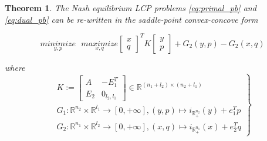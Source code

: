 \documentclass{article} %
\newtheorem{theorem}{Theorem} \newtheorem{lemma}[theorem]{Lemma}
\begin{document}
\begin{theorem}
  The Nash equilibrium LCP problems \eqref{eq:primal_pb} and \eqref{eq:dual_pb} can be re-written in the saddle-point convex-concove form
  
  \begin{equation}
    \underset{y, p}{minimize}\text{ }\underset{x, q}{maximize}
           {\begin{bmatrix}x\\q\end{bmatrix}^TK\begin{bmatrix}y\\p\end{bmatrix} + G_2(y, p) - G_2(x, q)}
           \label{eq:unconstrained_pb}
  \end{equation}

  where
  \begin{equation}
    \left .
    \begin{split}
      K :=
      \left[
        \begin{array}{c|c}
          A & -E_1^T \\ \hline
          E_2 & 0_{l_2, l_1}
        \end{array}
        \right] \in \mathbb{R}^{(n_1 + l_2) \times (n_2 + l_1)} \\
      G_1: \mathbb{R}^{n_2} \times \mathbb{R}^{l_1} \rightarrow [0, +\infty], (y, p) \mapsto i_{\mathbb{R}^{n_2}_+}(y) + e_1^Tp\\
      G_2: \mathbb{R}^{n_1} \times \mathbb{R}^{l_2} \rightarrow [0, +\infty], (x, q) \mapsto i_{\mathbb{R}^{n_1}_+}(x) + e_2^Tq
    \end{split}
    \right\}
    \label{eq:things}
  \end{equation}
  

  \label{thm:pd}
\end{theorem}
\end{document}
